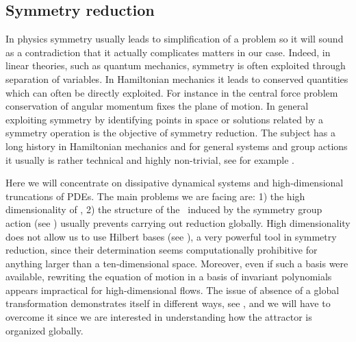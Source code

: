 \subsection{Symmetry reduction}

In physics symmetry usually leads to simplification of a problem so it will sound as a contradiction that it actually
complicates matters in our case.
Indeed, in linear theories, such as quantum mechanics, symmetry is often exploited
through separation of variables. In Hamiltonian mechanics it leads to conserved quantities which can often be
directly exploited. For instance in the central force problem conservation of angular momentum fixes the plane
of motion. %
In general exploiting symmetry by identifying points in space or solutions
related by a symmetry operation is the objective of
symmetry reduction. The subject has a long history in Hamiltonian mechanics and for general systems
and group actions it usually is rather technical and highly non-trivial, see for example
.

Here we will concentrate on dissipative dynamical systems and high-dimensional truncations
of PDEs. The main problems we are facing are: 1) the high dimensionality of \statesp, 2) the structure of
the \statesp\ induced by the symmetry group action (see )
usually prevents carrying out reduction globally.
High dimensionality does not allow us to use Hilbert bases (see ),
a very powerful tool in symmetry reduction,
since their determination seems computationally prohibitive for anything larger
than a ten-dimensional space. Moreover, even if such a basis were available,
rewriting the equation of motion in a basis of invariant polynomials appears impractical for high-dimensional
flows. The issue of absence of  a global transformation demonstrates itself in different
ways, see , and we will have to overcome it since we are interested in understanding
how the attractor is organized globally.

